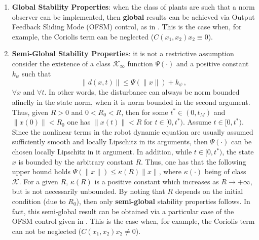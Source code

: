 \documentclass[letterpaper, 10 pt, conference]{ieeeconf}  %
\theoremstyle{plain}
\theoremstyle{definition}
\theoremstyle{remark}
\begin{document}
\begin{footnotesize}
\begin{enumerate}
				\item {\bf Global Stability Properties}: when the class of plants are such that a norm observer can be implemented, then {\bf global} results can be achieved via Output Feedback Sliding Mode (OFSM) control, as in \cite{POH:2011}. This is the case  when, for example, the Coriolis term can be neglected ($C(x_1,x_2) x_2 \equiv 0$).
				
				
				\item {\bf Semi-Global Stability Properties}:  it is not a restrictive assumption consider the existence of a class $\mathcal{K}_{\infty}$ function $\Psi(\cdot)$ and a positive constant $k_\psi$ such that 
				$$\|d(x,t)\| \leq \Psi(\|x\|) + k_\psi\,,$$
				$\forall x$ and $\forall t$. In other words, the disturbance 
				can always be norm bounded afinelly in the state norm, when it is norm bounded in the second argument. Thus, given $R>0$ and $0<R_0<R$, then for some $t^* \in (0,t_M)$ and $\|x(0)\| < R_0$ one has $\|x(t)\| < R$ for $t \in [0,t^*)$. Assume $t \in [0,t^*)$. Since the  nonlinear terms in the robot dynamic equation are usually assumed sufficiently smooth and locally Lipschitz in its arguments, then  $\Psi(\cdot)$ can be chosen locally Lipschitz in it argument. In
				addition, while $t \in [0,t^*)$, the state $x$ is
				bounded by the arbitrary constant $R$. Thus, one has that the following upper bound holds $\Psi(\|x\|) \leq \kappa(R)\|x\|$, where $\kappa(\cdot)$
				being of class $\mathcal{K}$. For a given $R$, $\kappa(R)$ is a
				positive constant which increases as $R \rightarrow +\infty$, but
				is not necessarily unbounded. By noting that $R$ depends on the initial condition (due to $R_0$), then only {\bf semi-global} stability properties follows. In fact, this semi-global result  can be obtained via a particular case of the OFSM control given in \cite{POH:2011}. This is the case  when, for example, the Coriolis term can not be neglected ($C(x_1,x_2) x_2 \neq 0$).
				
				\end{enumerate}

	 
%
%
%
%


\end{footnotesize}
\end{document}

